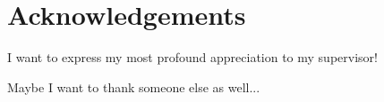 \chapter{Acknowledgements}

I want to express my most profound appreciation to my supervisor!

Maybe I want to thank someone else as well...